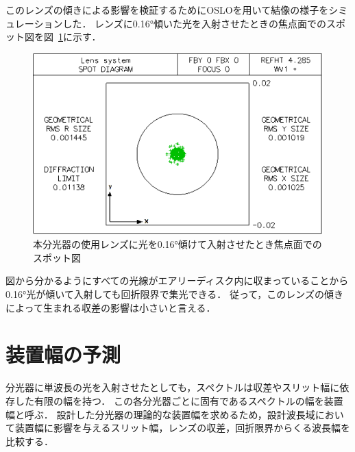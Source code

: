 このレンズの傾きによる影響を検証するためにOSLOを用いて結像の様子をシミュレーションした．
レンズに0.16°傾いた光を入射させたときの焦点面でのスポット図を図\ \ref{fig:lens_spot_zure}に示す．
\begin{figure}[htbp]
    \centering
    \includegraphics[scale=0.6]{figure/lens_spot_zure.pdf}
    \caption{本分光器の使用レンズに光を0.16°傾けて入射させたとき焦点面でのスポット図}
    \label{fig:lens_spot_zure}
\end{figure}
図から分かるようにすべての光線がエアリーディスク内に収まっていることから0.16°光が傾いて入射しても回折限界で集光できる．
従って，このレンズの傾きによって生まれる収差の影響は小さいと言える．

\section{装置幅の予測}
分光器に単波長の光を入射させたとしても，スペクトルは収差やスリット幅に依存した有限の幅を持つ．
この各分光器ごとに固有であるスペクトルの幅を装置幅と呼ぶ．
設計した分光器の理論的な装置幅を求めるため，設計波長域において装置幅に影響を与えるスリット幅，レンズの収差，回折限界からくる波長幅を比較する．

